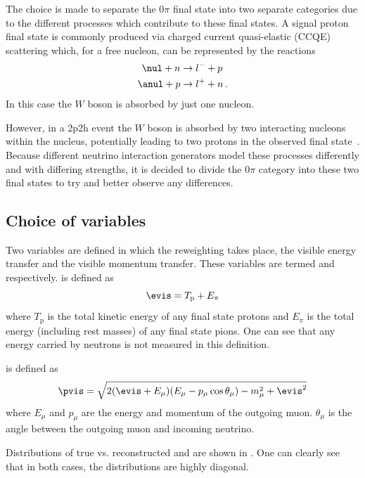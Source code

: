 The choice is made to separate the $0\pi$ final state into two separate categories due to the different processes which contribute to these final states.
A signal proton final state is commonly produced via charged current quasi-elastic (CCQE) scattering which, for a free nucleon, can be represented by the reactions
\begin{align}
	\nul + n &\rightarrow l^{-} + p \\
	\anul + p &\rightarrow l^{+} + n \, .
\end{align}
In this case the $W$ boson is absorbed by just one nucleon.

However, in a 2p2h event the $W$ boson is absorbed by two interacting nucleons within the nucleus, potentially leading to two protons in the observed final state~\cite{2p2h}.
Because different neutrino interaction generators model these processes differently and with differing strengths, it is decided to divide the $0\pi$ category into these two final states to try and better observe any differences.

\subsection{Choice of variables}
\label{sec:dune_ndrwt:rwt:kinematics}

Two variables are defined in which the reweighting takes place, the visible energy transfer and the visible momentum transfer. 
These variables are termed \evis and \pvis respectively.
\evis is defined as 
\begin{equation}
	\evis = T_{\textrm{p}} + E_{\pi}
\end{equation}
where $T_{\textrm{p}}$ is the total kinetic energy of any final state protons and $E_{\pi}$ is the total energy (including rest masses) of any final state pions.
One can see that any energy carried by neutrons is not measured in this definition.

\pvis is defined as
\begin{equation}
	\pvis = \sqrt{ 2(\evis + E_{\mu})(E_{\mu} - p_{\mu}\cos\theta_{\mu}) - m_{\mu}^{2} + \evis^{2} }
\end{equation}
where $E_{\mu}$ and $p_{\mu}$ are the energy and momentum of the outgoing muon.
$\theta_{\mu}$ is the angle between the outgoing muon and incoming neutrino.

Distributions of true vs. reconstructed \evis and \pvis are shown in .
One can clearly see that in both cases, the distributions are highly diagonal.

